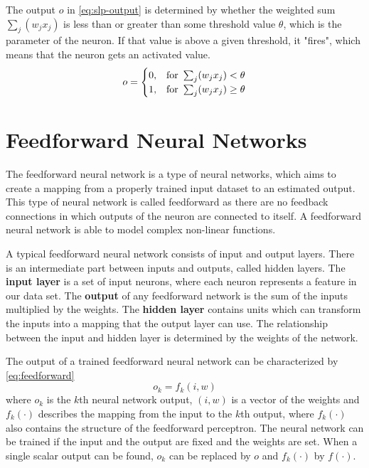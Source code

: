 The output $o$ in \eqref{eq:slp-output} is determined by whether the weighted sum $\sum_j(w_j x_j)$ is less than or greater than some threshold value $\theta$, which is the parameter of the neuron. If that value is above a given threshold, it "fires", which means that the neuron gets an activated value. 
\begin{equation} o = \begin{cases} 0, & \hbox{for}~ \sum_j(w_j x_j) < \theta \\ 1, & \hbox{for}~ \sum_j(w_j x_j) \geq \theta \end{cases} \label{eq:slp-output} \end{equation} 



\section{Feedforward Neural Networks}

The feedforward neural network \cite{fine2006feedforward} is a type of neural networks, which aims to create a mapping from a properly trained input dataset to an estimated output. This type of neural network is called feedforward as there are no feedback connections in which outputs of the neuron are connected to itself. A feedforward neural network is able to model complex non-linear functions. \medskip

A typical feedforward neural network consists of input and output layers. There is an intermediate part between inputs and outputs, called hidden layers. The \textbf{input layer} is a set of input neurons, where each neuron represents a feature in our data set. The \textbf{output} of any feedforward network is the sum of the inputs multiplied by the weights. The \textbf{hidden layer} contains units which can transform the inputs into a mapping that the output layer can use. The relationship between the input and hidden layer is determined by the weights of the network. \medskip

\noindent The output of a trained feedforward neural network can be characterized by \eqref{eq:feedforward}
\begin{equation} o_k = f_k(i,w) \label{eq:feedforward} \end{equation}
where $o_k$ is the $k$th neural network output, $(i,w)$ is a vector of the weights and $f_k(\cdot)$ describes the mapping from the input to the $k$th output, where $f_k(\cdot)$ also contains the structure of the feedforward perceptron. The neural network can be trained if the input and the output are fixed and the weights are set. When a single scalar output can be found, $o_k$ can be replaced by $o$ and $f_k(\cdot)$ by $f(\cdot)$.



